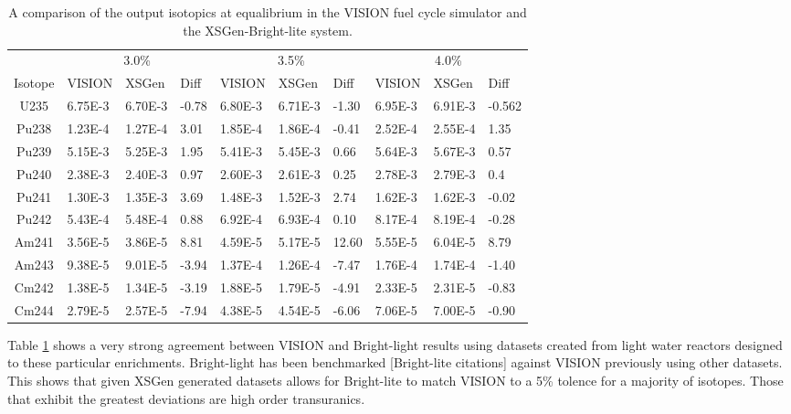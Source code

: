 \documentclass{article}
\newcommand\mTW{1.25cm}
\begin{document}
\begin{table}[!htb]
\centering
\small
\caption{A comparison of the output isotopics at equalibrium in the VISION fuel cycle simulator and the XSGen-Bright-lite system.}
\label{tab:a}
\vspace{0.5em}
\hspace*{-5em}\begin{tabular}{|c| m{\mTW} m{\mTW} m{1cm}| m{\mTW} m{\mTW} m{1cm} | m{\mTW} m{\mTW} m{1cm} |}
 & \multicolumn{3}{c}{3.0\%} & \multicolumn{3}{c}{3.5\%} & \multicolumn{3}{c}{4.0\%} \\
Isotope & VISION & XSGen & Diff & VISION & XSGen & Diff & VISION & XSGen & Diff \\
\hline
U235 & 6.75E-3 & 6.70E-3 & -0.78 & 6.80E-3 & 6.71E-3 & -1.30 & 6.95E-3 & 6.91E-3 & -0.562 \\
Pu238 & 1.23E-4 & 1.27E-4 & 3.01 & 1.85E-4 & 1.86E-4 & -0.41 & 2.52E-4 & 2.55E-4 & 1.35 \\
Pu239 & 5.15E-3 & 5.25E-3 & 1.95 & 5.41E-3 & 5.45E-3 & 0.66 & 5.64E-3 & 5.67E-3 & 0.57 \\
Pu240 & 2.38E-3 & 2.40E-3 & 0.97 & 2.60E-3 & 2.61E-3 & 0.25 & 2.78E-3 & 2.79E-3 & 0.4 \\
Pu241 & 1.30E-3 & 1.35E-3 & 3.69 & 1.48E-3 & 1.52E-3 & 2.74 & 1.62E-3 & 1.62E-3 & -0.02 \\
Pu242 & 5.43E-4 & 5.48E-4 & 0.88 & 6.92E-4 & 6.93E-4 & 0.10 & 8.17E-4 & 8.19E-4 & -0.28 \\
Am241 & 3.56E-5 & 3.86E-5 & 8.81 & 4.59E-5 & 5.17E-5 & 12.60 & 5.55E-5 & 6.04E-5 & 8.79 \\
Am243 & 9.38E-5 & 9.01E-5 & -3.94 & 1.37E-4 & 1.26E-4 & -7.47 & 1.76E-4 & 1.74E-4 & -1.40 \\
Cm242 & 1.38E-5 & 1.34E-5 & -3.19 & 1.88E-5 & 1.79E-5 & -4.91 & 2.33E-5 & 2.31E-5 & -0.83 \\
Cm244 & 2.79E-5 & 2.57E-5 & -7.94 & 4.38E-5 & 4.54E-5 & -6.06 & 7.06E-5 & 7.00E-5 & -0.90 \\
\hline
\end{tabular}
\end{table}

Table \ref{tab:a} shows a very strong agreement between VISION and Bright-light results using datasets created from light water reactors designed to these particular enrichments. Bright-light has been benchmarked [Bright-lite citations] against VISION previously using other datasets. This shows that given XSGen generated datasets allows for Bright-lite to match VISION to a 5\% tolence for a majority of isotopes. Those that exhibit the greatest deviations are high order transuranics.
\end{document}
